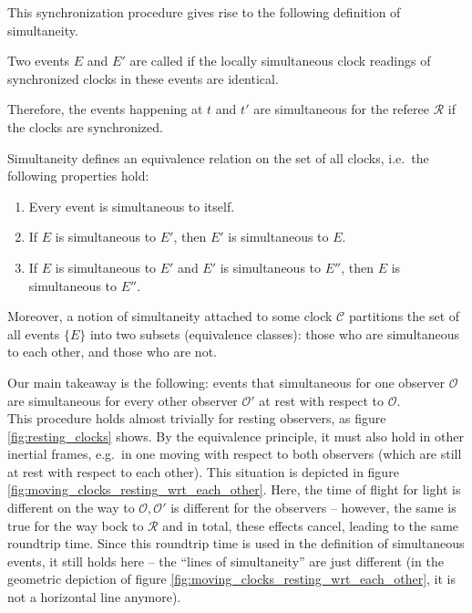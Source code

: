 This synchronization procedure gives rise to the following definition of simultaneity.
\begin{defi}[Simultaneity]
Two events $E$ and $E'$ are called  if the locally simultaneous clock readings of synchronized clocks in these events are identical.
\end{defi}
Therefore, the events happening at $t$ and $t'$ are simultaneous for the referee $\mathcal{R}$ if the clocks are synchronized.

\begin{prop}[Simultaneity]
Simultaneity defines an equivalence relation on the set of all clocks, i.e.~the following properties hold:
\begin{enumerate}
\item Every event is simultaneous to itself.

\item If $E$ is simultaneous to $E'$, then $E'$ is simultaneous to $E$.

\item If $E$ is simultaneous to $E'$ and $E'$ is simultaneous to $E''$, then $E$ is simultaneous to $E''$.
\end{enumerate}

Moreover, a notion of simultaneity attached to some clock $\mathcal{C}$ partitions the set of all events $\{E\}$ into two subsets (equivalence classes): those who are simultaneous to each other, and those who are not.
\end{prop}
Our main takeaway is the following: events that simultaneous for one observer $\mathcal{O}$ are simultaneous for every other observer $\mathcal{O}'$ at rest with respect to $\mathcal{O}$.\\



This procedure holds almost trivially for resting observers, as figure \ref{fig:resting_clocks} shows. By the equivalence principle, it must also hold in other inertial frames, e.g.~in one moving with respect to both observers (which are still at rest with respect to each other). This situation is depicted in figure \ref{fig:moving_clocks_resting_wrt_each_other}. Here, the time of flight for light is different on the way to $\mathcal{O}, \mathcal{O}'$ is different for the observers -- however, the same is true for the way bock to $\mathcal{R}$ and in total, these effects cancel, leading to the same roundtrip time. Since this roundtrip time is used in the definition of simultaneous events, it still holds here -- the \enquote{lines of simultaneity} are just different (in the geometric depiction of figure \ref{fig:moving_clocks_resting_wrt_each_other}, it is not a horizontal line anymore).

